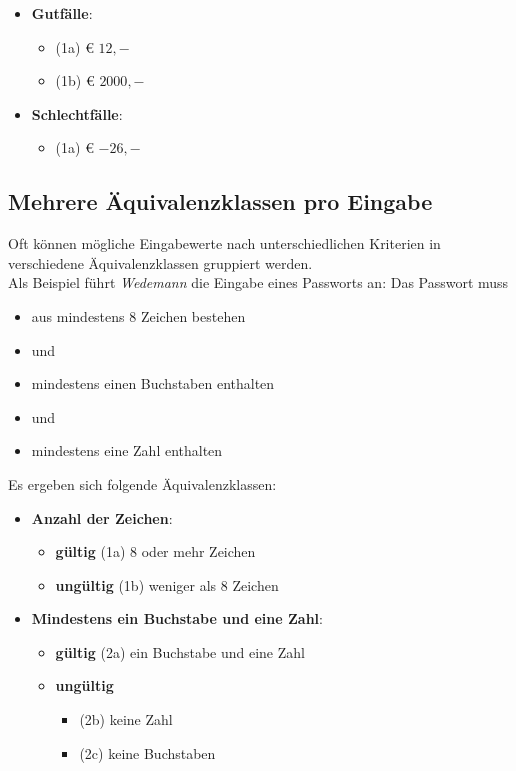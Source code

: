 \begin{itemize}
    \item \textbf{Gutfälle}:
    \begin{itemize}
        \item (1a) € $12,-$
        \item (1b) € $2000,-$
    \end{itemize}
    \item \textbf{Schlechtfälle}:
    \begin{itemize}
        \item (1a) € $-26,-$
    \end{itemize}
\end{itemize}

\subsection*{Mehrere Äquivalenzklassen pro Eingabe}
Oft können mögliche Eingabewerte nach unterschiedlichen Kriterien in verschiedene Äquivalenzklassen gruppiert werden.\\
Als Beispiel führt \textit{Wedemann} die Eingabe eines Passworts an: Das Passwort muss
\begin{itemize}
    \item aus mindestens 8 Zeichen bestehen
    \item[] und
    \item mindestens einen Buchstaben enthalten
    \item[] und
    \item mindestens eine Zahl enthalten
\end{itemize}

\noindent
Es ergeben sich folgende Äquivalenzklassen:

\begin{itemize}
    \item \textbf{Anzahl der Zeichen}:
    \begin{itemize}
        \item[] \textbf{gültig} (1a) 8 oder mehr Zeichen
        \item[] \textbf{ungültig} (1b) weniger als 8 Zeichen
    \end{itemize}
    \item \textbf{Mindestens ein Buchstabe und eine Zahl}:
    \begin{itemize}
        \item[] \textbf{gültig} (2a) ein Buchstabe und eine Zahl
        \item[] \textbf{ungültig}
        \begin{itemize}
            \item[] (2b) keine Zahl
            \item[] (2c) keine Buchstaben
        \end{itemize}
    \end{itemize}
\end{itemize}

